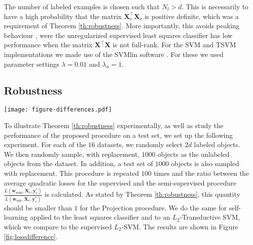 \documentclass[sts,preprint]{imsart-custom}
\newcommand{\Xe}{\vec{X}_\mathrm{e}  }
\renewcommand{\vec}[1]{\mathbf{#1}}
\begin{document}
The number of labeled examples is chosen such that $N_l>d$. This is necessarily to have a high probability that the matrix $\vec{X}_\text{e}^\top \vec{X}_\text{e}$ is positive definite, which was a requirement of Theorem \ref{th:robustness}. More importantly, this avoids peaking behaviour \citep{Raudys1998, Opper1996}, were the unregularized supervised least squares classifier has low performance when the matrix $\vec{X}^\top \vec{X}$ is not full-rank. For the SVM and TSVM implementations we made use of the SVMlin software \citep{Sindhwani2006}. For these we used parameter settings $\lambda=0.01$ and $\lambda_u=1$.

\subsection{Robustness}
\begin{figure*}
\centering
\texttt{[image: figure-differences.pdf]}
\caption{Ratio of the loss in terms of surrogate loss of supervised and semi-supervised solutions measured on the labeled and unlabeled instances. Values smaller than $1$ indicate that the semi-supervised method gives a lower average surrogate loss than its supervised counterpart. For both the projected estimator and self-learning this supervised counterpart is the supervised least squares classifier and loss is in terms of quadratic loss. For the $L_2$-Transductive SVM, quadratic hinge loss is used and compared to the quadratic hinge loss of a supervised $L_2$-SVM. Unlike the other semi-supervised procedures, the projection method, evaluated on labeled and unlabeled data, never has higher loss than the supervised procedure, as was proven in Theorem~\ref{th:robustness}.}
\label{fig:lossdifference}
\end{figure*}

To illustrate Theorem \ref{th:robustness} experimentally, as well as study the performance of the proposed procedure on a test set, we set up the following experiment. For each of the $16$ datasets, we randomly select $2 d$ labeled objects. We then randomly sample, with replacement, $1000$ objects as the unlabeled objects from the dataset. In addition, a test set of $1000$ objects is also sampled with replacement. This procedure is repeated $100$ times and the ratio between the average quadratic losses for the supervised and the semi-supervised procedure $\tfrac{L(\vec{w}_\text{semi},\Xe,\vec{y}_\text{e}^{\ast})}{L(\vec{w}_\text{sup},\Xe,\vec{y}_\text{e}^{\ast})}$ is calculated. As stated by Theorem \ref{th:robustness}, this quantity should be smaller than $1$ for the Projection procedure. We do the same for self-learning applied to the least squares classifier and to an $L_2$-Transductive SVM, which we compare to the supervised $L_2$-SVM. The results are shown in Figure \ref{fig:lossdifference}. 
\end{document}
